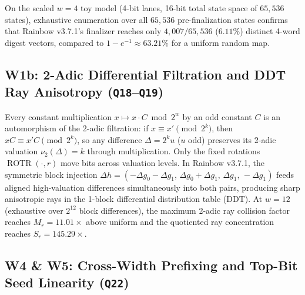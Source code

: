 \documentclass[10pt]{article}
\theoremstyle{definition}
\newcommand{\ROTR}{\operatorname{ROTR}}
\newcommand{\code}[1]{\texttt{#1}}
\begin{document}
On the scaled $w=4$ toy model (4-bit lanes, 16-bit total state space of $65{,}536$ states), exhaustive enumeration over all $65{,}536$ pre-finalization states confirms that Rainbow v3.7.1's finalizer reaches only $4{,}007 / 65{,}536$ ($6.11\%$) distinct 4-word digest vectors, compared to $1 - e^{-1} \approx 63.21\%$ for a uniform random map.

\subsection{W1b: 2-Adic Differential Filtration and DDT Ray Anisotropy (\code{Q18}--\code{Q19})}
\label{sec:ddt}

Every constant multiplication $x \mapsto x \cdot C \bmod 2^w$ by an odd constant $C$ is an automorphism of the 2-adic filtration: if $x \equiv x' \pmod{2^k}$, then $x C \equiv x' C \pmod{2^k}$, so any difference $\Delta = 2^k u$ ($u$ odd) preserves its 2-adic valuation $\nu_2(\Delta) = k$ through multiplication. Only the fixed rotations $\ROTR(\cdot, r)$ move bits across valuation levels. In Rainbow v3.7.1, the symmetric block injection $\Delta h = (-\Delta g_0 - \Delta g_1,\, \Delta g_0 + \Delta g_1,\, \Delta g_1,\, -\Delta g_1)$ feeds aligned high-valuation differences simultaneously into both pairs, producing sharp anisotropic rays in the 1-block differential distribution table (DDT). At $w=12$ (exhaustive over $2^{12}$ block differences), the maximum 2-adic ray collision factor reaches $M_r = 11.01\times$ above uniform and the quotiented ray concentration reaches $S_r = 145.29\times$.

\subsection{W4 \& W5: Cross-Width Prefixing and Top-Bit Seed Linearity (\code{Q22})}
\label{sec:seediv}
\end{document}
